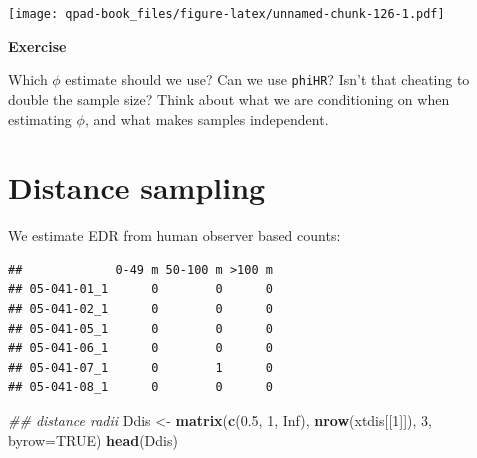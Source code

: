 \documentclass[12pt,]{book}
\newenvironment{Shaded}{\begin{snugshade}}{\end{snugshade}}
\newcommand{\CommentTok}[1]{\textcolor[rgb]{0.56,0.35,0.01}{\textit{#1}}}
\newcommand{\ControlFlowTok}[1]{\textcolor[rgb]{0.13,0.29,0.53}{\textbf{#1}}}
\newcommand{\DataTypeTok}[1]{\textcolor[rgb]{0.13,0.29,0.53}{#1}}
\newcommand{\DecValTok}[1]{\textcolor[rgb]{0.00,0.00,0.81}{#1}}
\newcommand{\FloatTok}[1]{\textcolor[rgb]{0.00,0.00,0.81}{#1}}
\newcommand{\KeywordTok}[1]{\textcolor[rgb]{0.13,0.29,0.53}{\textbf{#1}}}
\newcommand{\NormalTok}[1]{#1}
\newcommand{\OperatorTok}[1]{\textcolor[rgb]{0.81,0.36,0.00}{\textbf{#1}}}
\newcommand{\OtherTok}[1]{\textcolor[rgb]{0.56,0.35,0.01}{#1}}
\newcommand{\StringTok}[1]{\textcolor[rgb]{0.31,0.60,0.02}{#1}}
\let\BeginKnitrBlock\begin \let\EndKnitrBlock\end
\begin{document}
\texttt{[image: qpad-book\_files/figure-latex/unnamed-chunk-126-1.pdf]}

\BeginKnitrBlock{rmdexercise}
\textbf{Exercise}

Which \(\phi\) estimate should we use? Can we use \texttt{phiHR}?
Isn't that cheating to double the sample size?
Think about what we are conditioning on when estimating \(\phi\), and what makes samples independent.
\EndKnitrBlock{rmdexercise}

\hypertarget{distance-sampling-1}{%
\section{Distance sampling}\label{distance-sampling-1}}

We estimate EDR from human observer based counts:

\begin{Shaded}
\end{Shaded}

\begin{verbatim}
##             0-49 m 50-100 m >100 m
## 05-041-01_1      0        0      0
## 05-041-02_1      0        0      0
## 05-041-05_1      0        0      0
## 05-041-06_1      0        0      0
## 05-041-07_1      0        1      0
## 05-041-08_1      0        0      0
\end{verbatim}

\begin{Shaded}
\begin{Highlighting}[]
\CommentTok{## distance radii}
\NormalTok{Ddis <-}\StringTok{ }\KeywordTok{matrix}\NormalTok{(}\KeywordTok{c}\NormalTok{(}\FloatTok{0.5}\NormalTok{, }\DecValTok{1}\NormalTok{, }\OtherTok{Inf}\NormalTok{), }\KeywordTok{nrow}\NormalTok{(xtdis[[}\DecValTok{1}\NormalTok{]]), }\DecValTok{3}\NormalTok{, }\DataTypeTok{byrow=}\OtherTok{TRUE}\NormalTok{)}
\KeywordTok{head}\NormalTok{(Ddis)}
\end{Highlighting}
\end{Shaded}
\end{document}
